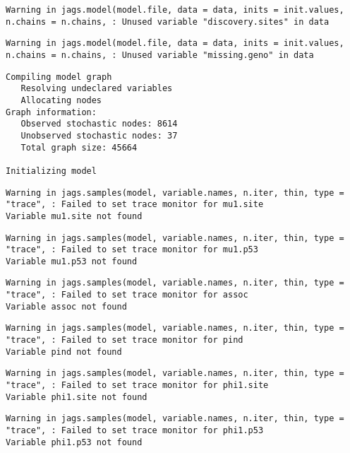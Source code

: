 \documentclass[12pt,twoside]{dukestatscithesis}
\theoremstyle{definition}
\theoremstyle{definition}
\theoremstyle{definition}
\theoremstyle{remark}
\begin{document}
\begin{verbatim}
Warning in jags.model(model.file, data = data, inits = init.values,
n.chains = n.chains, : Unused variable "discovery.sites" in data
\end{verbatim}
\begin{verbatim}
Warning in jags.model(model.file, data = data, inits = init.values,
n.chains = n.chains, : Unused variable "missing.geno" in data
\end{verbatim}
\begin{verbatim}
Compiling model graph
   Resolving undeclared variables
   Allocating nodes
Graph information:
   Observed stochastic nodes: 8614
   Unobserved stochastic nodes: 37
   Total graph size: 45664

Initializing model
\end{verbatim}
\begin{verbatim}
Warning in jags.samples(model, variable.names, n.iter, thin, type = "trace", : Failed to set trace monitor for mu1.site
Variable mu1.site not found
\end{verbatim}
\begin{verbatim}
Warning in jags.samples(model, variable.names, n.iter, thin, type = "trace", : Failed to set trace monitor for mu1.p53
Variable mu1.p53 not found
\end{verbatim}
\begin{verbatim}
Warning in jags.samples(model, variable.names, n.iter, thin, type = "trace", : Failed to set trace monitor for assoc
Variable assoc not found
\end{verbatim}
\begin{verbatim}
Warning in jags.samples(model, variable.names, n.iter, thin, type = "trace", : Failed to set trace monitor for pind
Variable pind not found
\end{verbatim}
\begin{verbatim}
Warning in jags.samples(model, variable.names, n.iter, thin, type = "trace", : Failed to set trace monitor for phi1.site
Variable phi1.site not found
\end{verbatim}
\begin{verbatim}
Warning in jags.samples(model, variable.names, n.iter, thin, type = "trace", : Failed to set trace monitor for phi1.p53
Variable phi1.p53 not found
\end{verbatim}
\begin{Shaded}
\begin{Highlighting}[]
\StringTok{ }\NormalTok{(}\NormalTok{, }
\end{Highlighting}
\end{Shaded}
\end{document}
